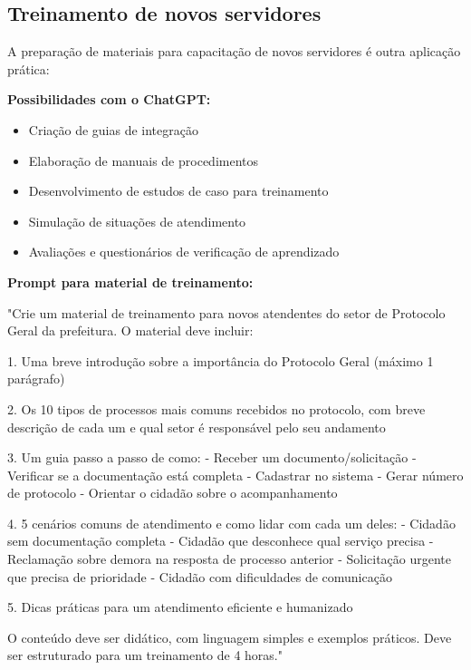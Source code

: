\documentclass[12pt,a4paper]{book}
\begin{document}
\subsection{Treinamento de novos servidores}

A preparação de materiais para capacitação de novos servidores é outra aplicação prática:

\textbf{Possibilidades com o ChatGPT:}
\begin{itemize}
    \item Criação de guias de integração
    \item Elaboração de manuais de procedimentos
    \item Desenvolvimento de estudos de caso para treinamento
    \item Simulação de situações de atendimento
    \item Avaliações e questionários de verificação de aprendizado
\end{itemize}

\begin{tcolorbox}[exemplo]
\textbf{Prompt para material de treinamento:}

"Crie um material de treinamento para novos atendentes do setor de Protocolo Geral da prefeitura. O material deve incluir:

1. Uma breve introdução sobre a importância do Protocolo Geral (máximo 1 parágrafo)

2. Os 10 tipos de processos mais comuns recebidos no protocolo, com breve descrição de cada um e qual setor é responsável pelo seu andamento

3. Um guia passo a passo de como:
   - Receber um documento/solicitação
   - Verificar se a documentação está completa
   - Cadastrar no sistema
   - Gerar número de protocolo
   - Orientar o cidadão sobre o acompanhamento

4. 5 cenários comuns de atendimento e como lidar com cada um deles:
   - Cidadão sem documentação completa
   - Cidadão que desconhece qual serviço precisa
   - Reclamação sobre demora na resposta de processo anterior
   - Solicitação urgente que precisa de prioridade
   - Cidadão com dificuldades de comunicação

5. Dicas práticas para um atendimento eficiente e humanizado

O conteúdo deve ser didático, com linguagem simples e exemplos práticos. Deve ser estruturado para um treinamento de 4 horas."
\end{tcolorbox}
\end{document}
